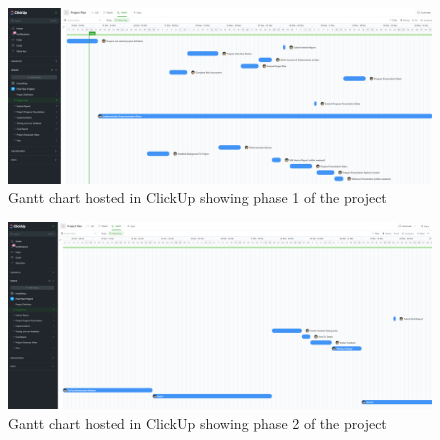 \documentclass[a4paper, 12pt, british]{article}
\begin{document}
\begin{figure}
    \includegraphics[width=1.1\textwidth]{project-plan-phase-1}
    \caption{Gantt chart hosted in ClickUp showing phase 1 of the project}
    \label{fig:project_plan_1}
\end{figure}

\begin{figure}
    \includegraphics[width=1.1\textwidth]{project-plan-phase-2}
    \caption{Gantt chart hosted in ClickUp showing phase 2 of the project}
    \label{fig:project_plan_2}
\end{figure}




\printglossaries
\end{document}
